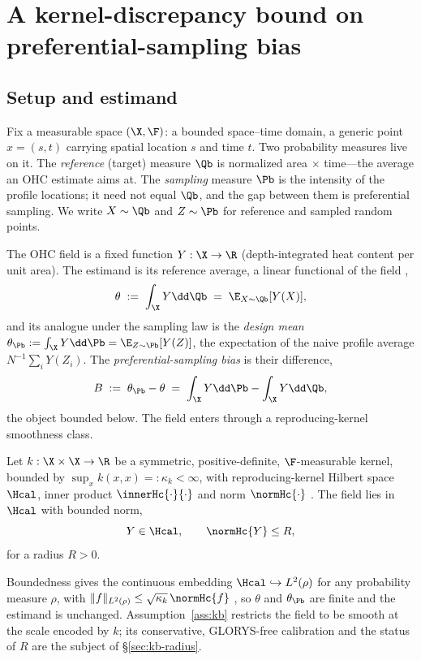 \section{A kernel-discrepancy bound on preferential-sampling bias}
\label{sec:kernel}

\subsection{Setup and estimand}
\label{sec:kb-setup}

Fix a measurable space $(\X,\F)$: a bounded space--time domain, a generic point
$x=(s,t)$ carrying spatial location $s$ and time $t$. Two probability measures
live on it. The \emph{reference} (target) measure $\Qb$ is normalized area
$\times$ time---the average an OHC estimate aims at. The \emph{sampling} measure
$\Pb$ is the intensity of the profile locations; it need not equal $\Qb$, and the
gap between them is preferential sampling. We write $X\sim\Qb$ and $Z\sim\Pb$ for
reference and sampled random points.

The OHC field is a fixed function $Y:\X\to\R$ (depth-integrated heat content per
unit area). The estimand is its reference average, a linear functional of the
field \citep{baugh2022},
\[
  \theta \;:=\; \int_\X Y\dd\Qb \;=\; \E_{X\sim\Qb}[Y(X)] ,
\]
and its analogue under the sampling law is the \emph{design mean}
$\theta_{\Pb}:=\int_\X Y\dd\Pb=\E_{Z\sim\Pb}[Y(Z)]$, the expectation of the naive
profile average $N^{-1}\sum_i Y(Z_i)$. The \emph{preferential-sampling bias} is
their difference,
\[
  B \;:=\; \theta_{\Pb}-\theta \;=\; \int_\X Y\dd\Pb-\int_\X Y\dd\Qb ,
\]
the object bounded below. The field enters through a reproducing-kernel smoothness
class.

\begin{assumption}
\label{ass:kb}
Let $k:\X\times\X\to\R$ be a symmetric, positive-definite, $\F$-measurable kernel,
bounded by $\sup_{x}k(x,x)=:\kappa_k<\infty$, with reproducing-kernel Hilbert space
$\Hcal$, inner product $\innerHc{\cdot}{\cdot}$ and norm $\normHc{\cdot}$
\citep{aronszajn1950,berlinet2004}. The field lies in $\Hcal$ with bounded norm,
\[
  Y\in\Hcal,\qquad \normHc{Y}\le R,
\]
for a radius $R>0$.
\end{assumption}

Boundedness gives the continuous embedding $\Hcal\hookrightarrow L^2(\rho)$ for any
probability measure $\rho$, with $\|f\|_{L^2(\rho)}\le\sqrt{\kappa_k}\,\normHc{f}$
\citep[eq.~3.13]{muandet2017}, so $\theta$ and $\theta_{\Pb}$ are finite and the
estimand is unchanged. Assumption~\ref{ass:kb} restricts the field to be smooth at
the scale encoded by $k$; its conservative, GLORYS-free calibration and the status
of $R$ are the subject of \S\ref{sec:kb-radius}.

